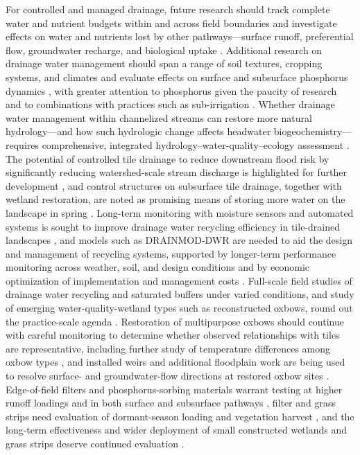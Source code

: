 For controlled and managed drainage, future research should track complete water and nutrient budgets within and across field boundaries \parencite{Shedekar2021} and investigate effects on water and nutrients lost by other pathways---surface runoff, preferential flow, groundwater recharge, and biological uptake \parencite{Ross2016}. Additional research on drainage water management should span a range of soil textures, cropping systems, and climates and evaluate effects on surface and subsurface phosphorus dynamics \parencite{King2022}, with greater attention to phosphorus given the paucity of research and to combinations with practices such as sub-irrigation \parencite{Ross2016}. Whether drainage water management within channelized streams can restore more natural hydrology---and how such hydrologic change affects headwater biogeochemistry---requires comprehensive, integrated hydrology--water-quality--ecology assessment \parencite{King2009}. The potential of controlled tile drainage to reduce downstream flood risk by significantly reducing watershed-scale stream discharge is highlighted for further development \parencite{Sunohara2015}, and control structures on subsurface tile drainage, together with wetland restoration, are noted as promising means of storing more water on the landscape in spring \parencite{Dalzell2018}. Long-term monitoring with moisture sensors and automated systems is sought to improve drainage water recycling efficiency in tile-drained landscapes \parencite{Kaur2021}, and models such as DRAINMOD-DWR are needed to aid the design and management of recycling systems, supported by longer-term performance monitoring across weather, soil, and design conditions and by economic optimization of implementation and management costs \parencite{Moursi2024}. Full-scale field studies of drainage water recycling and saturated buffers under varied conditions, and study of emerging water-quality-wetland types such as reconstructed oxbows, round out the practice-scale agenda \parencite{Mitchell2023}. Restoration of multipurpose oxbows should continue with careful monitoring to determine whether observed relationships with tiles are representative, including further study of temperature differences among oxbow types \parencite{Leberg2024}, and installed weirs and additional floodplain work are being used to resolve surface- and groundwater-flow directions at restored oxbow sites \parencite{Schilling2017}. Edge-of-field filters and phosphorus-sorbing materials warrant testing at higher runoff loadings and in both surface and subsurface pathways \parencite{Plach2023}, filter and grass strips need evaluation of dormant-season loading and vegetation harvest \parencite{Holly2016,Vallée2015}, and the long-term effectiveness and wider deployment of small constructed wetlands and grass strips deserve continued evaluation \parencite{Vallée2015}.

